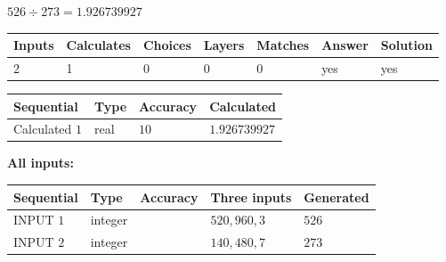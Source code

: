 \documentclass{ctexart}
\begin{document}
 

 
 
 
\noindent{}
 
 

$ %
526 \div  %
273=   %
1.926739927$
 
 
\noindent{}
 
 

 
   
   
   
   
\noindent\begin{tabular}{|l|l|l|l|l|l|l|}
 \hline
Inputs & Calculates & Choices & Layers & Matches & Answer & Solution \\ \hline
 2  & 
 1  & 
 0
  & 
 0  & 
 0  & 
  yes & 
  yes 
  \\ \hline
 \end{tabular}
   
   
   
   
\noindent{}
   
   
  
  
\noindent\begin{tabular}{|l|l|l|l|}
\hline
 Sequential & Type & Accuracy & Calculated \\ 
\hline
 
 
  Calculated $  1 $ & real & $  10  $ & 
 $ 1.926739927 $ 
 \\  \hline  
 \end{tabular}
   
   
   
   
\noindent\vspace{0.1in}\hspace{-0.08in} {\textbf{\Large{All inputs: }}}
   
   
  
  
\noindent\begin{tabular}{|l|l|l|l|l|}
\hline
 Sequential & Type & Accuracy & Three inputs & Generated \\ 
\hline
 
 
  INPUT $  1 $ & integer &  & $
 520
 , 
 960
 , 
 3
 $ & $ 526 $ 
 \\  \hline  
 
 
  INPUT $  2 $ & integer &  & $
 140
 , 
 480
 , 
 7
 $ & $ 273 $ 
 \\  \hline  
 \end{tabular}
   
\end{document}
